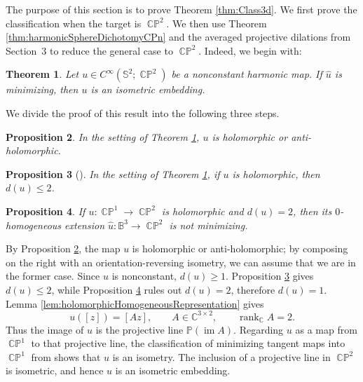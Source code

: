 \documentclass[11pt]{article}
\theoremstyle{plain}
\numberwithin{equation}{section}
\newtheorem{theorem}{Theorem}[section]
\newtheorem{proposition}[theorem]{Proposition}
\theoremstyle{definition}
\let\oldendproof\endproof
\renewenvironment{proof}[1][\proofname]{%
\oldproof[\upshape \bfseries #1]%
}{\oldendproof}
\def \C{\mathbb{C}}
\def \mb{\mathbb}
\DeclareMathOperator{\CP}{\mathbb{CP}}
\begin{document}
The purpose of this section is to prove Theorem \ref{thm:Class3d}.  We first
prove the classification when the target is $\CP^2$.  We then use Theorem
\ref{thm:harmonicSphereDichotomyCPn} and the averaged projective dilations from Section~3 to
reduce the general case to $\CP^2$.
Indeed, we begin with:

\begin{theorem}
    \label{thm:CP2Classification}
Let $u\in C^\infty(\mb S^2;\CP^2)$ be a nonconstant harmonic map.  If
$\hat u$ is minimizing, then $u$ is an isometric embedding.
\end{theorem}

We divide the proof of this result into the following three steps.

\begin{proposition}
    \label{prop:step1}
In the setting of Theorem \ref{thm:CP2Classification}, $u$
is holomorphic or anti-holomorphic.
\end{proposition}

\begin{proposition}[\cite{Fujioka1993}]
    \label{prop:step2}
In the setting of Theorem \ref{thm:CP2Classification}, if $u$ is
holomorphic, then $d(u)\leq2$.
\end{proposition}

\begin{proposition}
    \label{prop:step3}
If $u\colon\CP^1\to\CP^2$ is holomorphic and $d(u)=2$, then its
$0$-homogeneous extension $\hat u\colon\mb B^3\to\CP^2$ is not minimizing.
\end{proposition}

\begin{proof}[Proof of Theorem \ref{thm:CP2Classification}]
By Proposition \ref{prop:step1}, the map $u$ is holomorphic or
anti-holomorphic; by composing on the right with an
orientation-reversing isometry, we can assume that we are in the former case.
 Since $u$ is nonconstant, $d(u)\geq1$.  Proposition \ref{prop:step2} gives
$d(u)\leq2$, while Proposition \ref{prop:step3} rules out $d(u)=2$,
therefore $d(u)=1$.  Lemma
\ref{lem:holomorphicHomogeneousRepresentation} gives
\[
    u([z])=[Az],
    \qquad A\in\C^{3\times2},
    \qquad \operatorname{rank}_{\C}A=2.
\]
Thus the image of $u$ is the projective line $\mb P(\operatorname{im}A)$.
Regarding $u$ as a map from $\CP^1$ to that projective line, the
classification of minimizing tangent maps into $\CP^1$ from
\cite{Brezis1986} shows that $u$ is an isometry.  The inclusion of a
projective line in $\CP^2$ is isometric, and hence $u$ is an isometric
embedding. 
\end{proof}
\end{document}
